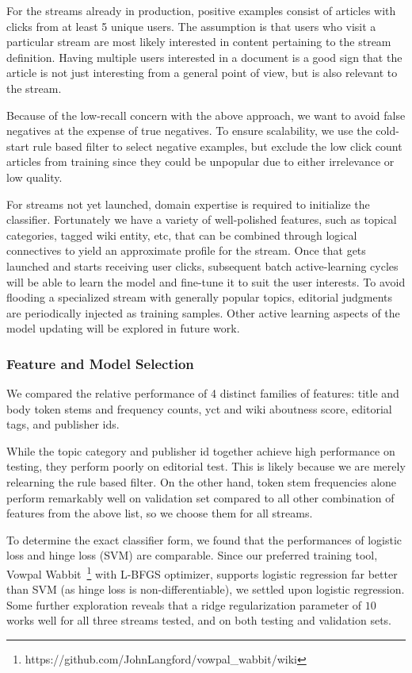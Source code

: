 \documentclass{sig-alternate}
\begin{document}
  For the streams already in production, positive examples consist of articles 
  with clicks from at least 5 unique 
  users. The assumption is that users who visit a 
  particular stream are most likely interested in content pertaining to the 
  stream definition. Having multiple users interested in a document is a good 
  sign that the article is not just interesting from a general point of view, 
  but is also relevant to the stream. 
   
   Because of the low-recall concern with the above approach, we want to 
   avoid false negatives at the expense of true negatives. To ensure 
   scalability, we use the cold-start rule based filter to select negative 
   examples, but exclude the low click 
   count articles from training since they could be 
   unpopular due to either irrelevance or low quality.

  For streams not yet launched, domain expertise is required to 
  initialize the classifier. Fortunately we have a variety of well-polished 
  features, such as topical categories, tagged wiki entity, etc, that can be 
  combined through logical connectives to yield an approximate profile for the 
  stream. Once that gets launched and starts receiving user clicks, subsequent 
  batch active-learning cycles will be able to learn the model and fine-tune 
  it to suit the user interests. To avoid flooding a 
  specialized stream with generally popular topics, editorial judgments are 
  periodically injected as training samples. Other active 
  learning aspects of the model updating will be explored in future work.

\subsubsection{Feature and Model Selection}
We compared the relative performance of 4 distinct families of features: title 
and body token stems and frequency counts, yct and wiki aboutness score, 
editorial tags, and publisher ids.

While the topic 
category and publisher id together achieve high performance on testing, they 
perform poorly on editorial test. This is likely because we are merely 
relearning the rule based filter. On the other hand, token stem 
frequencies alone perform remarkably well on validation set compared to all 
other combination of features from the above list, so we choose them 
for all streams.

To determine the exact classifier form, we found that the performances 
of logistic loss and hinge loss (SVM) are comparable. Since our 
preferred training tool, Vowpal 
Wabbit~\footnote{https://github.com/JohnLangford/vowpal\_wabbit/wiki} with 
L-BFGS optimizer, supports logistic regression far better than SVM (as hinge 
loss is non-differentiable), we settled upon logistic regression. Some further 
exploration reveals that a ridge regularization parameter of $10$ works well 
for all three streams tested, and on both testing and validation sets. 
\end{document}
